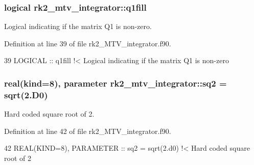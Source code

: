 \subsubsection[{\texorpdfstring{q1fill}{q1fill}}]{\setlength{\rightskip}{0pt plus 5cm}logical rk2\+\_\+mtv\+\_\+integrator\+::q1fill\hspace{0.3cm}{\ttfamily [private]}}\hypertarget{namespacerk2__mtv__integrator_a9fbcf5a43f09dfa39f6ebcacf1b5504c}{}\label{namespacerk2__mtv__integrator_a9fbcf5a43f09dfa39f6ebcacf1b5504c}


Logical indicating if the matrix Q1 is non-\/zero. 



Definition at line 39 of file rk2\+\_\+\+M\+T\+V\+\_\+integrator.\+f90.


\begin{DoxyCode}
39   \textcolor{keywordtype}{LOGICAL} :: q1fill\textcolor{comment}{                                               !< Logical indicating if the matrix Q1 is
       non-zero}
\end{DoxyCode}
\subsubsection[{\texorpdfstring{sq2}{sq2}}]{\setlength{\rightskip}{0pt plus 5cm}real(kind=8), parameter rk2\+\_\+mtv\+\_\+integrator\+::sq2 = sqrt(2.D0)\hspace{0.3cm}{\ttfamily [private]}}\hypertarget{namespacerk2__mtv__integrator_afebf6d33084a6677b313e21740aa6b8b}{}\label{namespacerk2__mtv__integrator_afebf6d33084a6677b313e21740aa6b8b}


Hard coded square root of 2. 



Definition at line 42 of file rk2\+\_\+\+M\+T\+V\+\_\+integrator.\+f90.


\begin{DoxyCode}
42   \textcolor{keywordtype}{REAL(KIND=8)}, \textcolor{keywordtype}{PARAMETER} :: sq2 = sqrt(2.d0)                     \textcolor{comment}{!< Hard coded square root of 2}
\end{DoxyCode}
